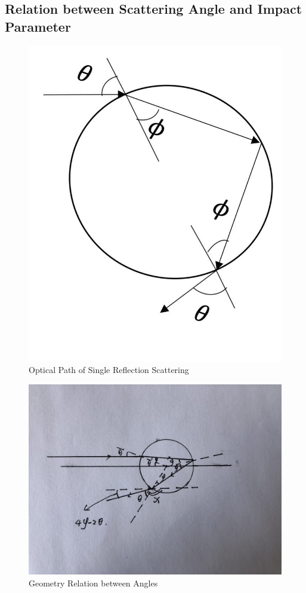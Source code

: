 \documentclass[%
 reprint,
 amsmath,amssymb,
 aps,
]{revtex4-1}
\begin{document}
\subsection{Relation between Scattering Angle and Impact Parameter}
\begin{figure}
    \centering
    \includegraphics[scale=0.2]{optical.jpg}
    \caption{Optical Path of Single Reflection Scattering}
\end{figure}
\begin{figure}
    \centering
    \includegraphics[scale=0.05]{geometryrelation.jpg}
    \caption{Geometry Relation between Angles}
    \label{fig:my_label}
\end{figure}
\end{document}

